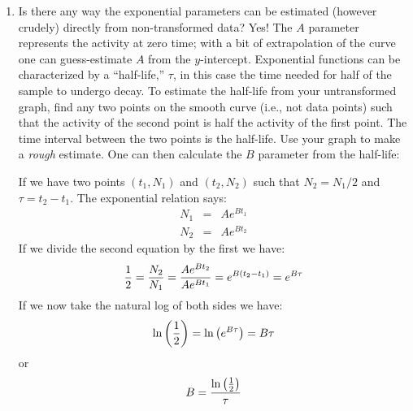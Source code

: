 \begin{enumerate}

%
\item Is there any way the  exponential parameters can be estimated (however crudely) directly from
non-transformed data?  Yes! The $A$ parameter represents the activity at zero time;
with a bit of extrapolation of the curve one can guess-estimate $A$ from the $y$-intercept.
Exponential functions can be characterized by a ``half-life,'' $\tau$,
in this case the time needed for half of the sample to undergo decay.
To estimate the half-life from your untransformed graph, find
any two points on the smooth curve (i.e., not data points) such that the activity 
of the second point
is half the activity of the first point.  The time interval between
the two points is the half-life.  Use your graph to make a {\em rough} estimate.
One can then calculate the $B$ parameter from the half-life:

If we have two points $(t_1,N_1)$ and $(t_2,N_2)$ such that
$N_2=N_1/2$ and $\tau=t_2-t_1$.  The exponential relation says:
\begin{eqnarray}
N_1&=&A e^{Bt_1}\\
N_2&=&Ae^{Bt_2}
\end{eqnarray}
If we divide the second equation by the first we have:
\begin{equation}
{1\over 2} =  {N_2\over N_1} = {Ae^{Bt_2} \over Ae^{Bt_1}} = e^{B(t_2-t_1)} =
e^{B\tau} 
\end{equation}
If we now take the natural log of both sides we have:
\begin{equation}
\ln\left({1\over 2}\right) = \ln\left(e^{B\tau}\right) = B\tau 
\end{equation}
or
\begin{equation}
B = {\ln\left({1\over 2}\right) \over \tau} 
\end{equation}


\end{enumerate}
